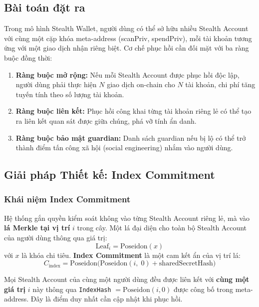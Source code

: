 \documentclass[../DoAn.tex]{subfiles}
\begin{document}
\subsection{Bài toán đặt ra}
\label{subsec:recovery_problem}

Trong mô hình Stealth Wallet, người dùng có thể sở hữu nhiều Stealth Account với cùng một cặp khóa meta-address (scanPriv, spendPriv), mỗi tài khoản tương ứng với một giao dịch nhận riêng biệt. Cơ chế phục hồi cần đối mặt với ba ràng buộc đồng thời:

\begin{enumerate}
    \item \textbf{Ràng buộc mở rộng:} Nếu mỗi Stealth Account được phục hồi độc lập, người dùng phải thực hiện $N$ giao dịch on-chain cho $N$ tài khoản, chi phí tăng tuyến tính theo số lượng tài khoản.
    \item \textbf{Ràng buộc liên kết:} Phục hồi công khai từng tài khoản riêng lẻ có thể tạo ra liên kết quan sát được giữa chúng, phá vỡ tính ẩn danh.
    \item \textbf{Ràng buộc bảo mật guardian:} Danh sách guardian nếu bị lộ có thể trở thành điểm tấn công xã hội (social engineering) nhắm vào người dùng.
\end{enumerate}

\subsection{Giải pháp Thiết kế: Index Commitment}
\label{subsec:recovery_solution}

\subsubsection{Khái niệm Index Commitment}

Hệ thống gắn quyền kiểm soát không vào từng Stealth Account riêng lẻ, mà vào \textbf{lá Merkle tại vị trí} $i$ trong cây. Một lá đại diện cho toàn bộ Stealth Account của người dùng thông qua giá trị:
\[
    \text{Leaf}_i = \text{Poseidon}(x)
\]
với $x$ là khóa chi tiêu. \textbf{Index Commitment} là một cam kết ẩn của vị trí lá:
\[
    C_{\text{index}} = \text{Poseidon}\!\bigl(\text{Poseidon}(i,\; 0) + \text{sharedSecretHash}\bigr)
\]

Mọi Stealth Account của cùng một người dùng đều được liên kết với \textbf{cùng một giá trị} $i$ này thông qua \texttt{IndexHash} $= \text{Poseidon}(i, 0)$ được công bố trong meta-address. Đây là điểm duy nhất cần cập nhật khi phục hồi.
\end{document}
